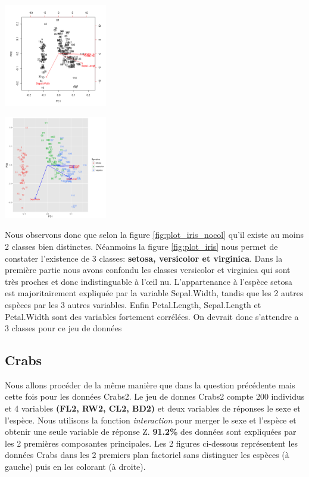 \documentclass[10pt]{article}
\begin{document}
	
			\begin{minipage}{.5\textwidth}
			\includegraphics[width=45mm]{Figures/Iris_1/plotnospieces.png}
			\label{fig:plot_iris_nocol}
		\end{minipage}%
		\hspace{0.02\linewidth}
		\begin{minipage}{.5\textwidth}
			\includegraphics[width=45mm]{Figures/Iris_1/plotspieces.png}
		\label{fig:plot_iris}
		\end{minipage}
		\vspace{0.2mm}
		
	 
		Nous observons donc que selon la figure  \ref{fig:plot_iris_nocol} qu'il existe au moins 2 classes bien distinctes. Néanmoins  la figure  \ref{fig:plot_iris} nous permet de constater l'existence de 3 classes: \textbf{setosa, versicolor et virginica}. Dans la première partie nous avons confondu les classes versicolor et virginica qui sont très proches et donc indistinguable à l'œil nu. L'appartenance à l'espèce setosa est majoritairement expliquée par la variable Sepal.Width, tandis que  les 2 autres espèces par les 3 autres variables. Enfin Petal.Length, Sepal.Length et  Petal.Width sont des variables fortement corrélées. On devrait donc s'attendre a 3 classes pour ce jeu de données

	\subsection{Crabs}
	Nous allons procéder de la même manière que dans la question précédente mais cette fois pour les données Crabs2. Le jeu de donnes Crabs2 compte 200 individus et 4 variables \textbf{(FL2, RW2,  CL2, BD2)}  et deux variables de réponses le sexe et l'espèce. Nous utilisons la fonction \textit{interaction} pour merger le sexe et l'espèce et obtenir une seule variable de réponse Z. \textbf{91.2\%} des données sont expliquées par les 2 premières composantes principales. Les 2 figures ci-dessous représentent les données Crabs dans les 2 premiers plan factoriel sans distinguer les espèces (à gauche) puis en les colorant (à droite).
	
\end{document}
